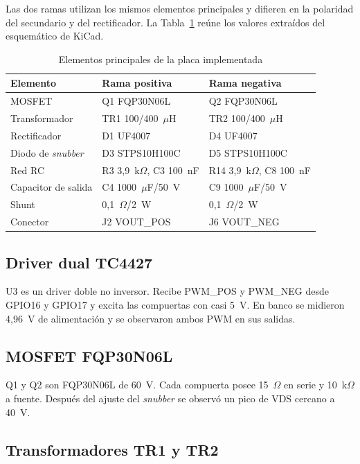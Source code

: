 \documentclass[conference]{IEEEtran}
\begin{document}
Las dos ramas utilizan los mismos elementos principales y difieren en la polaridad del secundario y del rectificador. La Tabla~\ref{tab:potencia} reúne los valores extraídos del esquemático de KiCad.

\begin{table}[!t]
\caption{Elementos principales de la placa implementada}
\label{tab:potencia}
\centering
\footnotesize
\begin{tabular}{@{}lll@{}}
\toprule
\textbf{Elemento} & \textbf{Rama positiva} & \textbf{Rama negativa} \\
\midrule
MOSFET & Q1 FQP30N06L & Q2 FQP30N06L \\
Transformador & TR1 100/400~$\mu$H & TR2 100/400~$\mu$H \\
Rectificador & D1 UF4007 & D4 UF4007 \\
Diodo de \textit{snubber} & D3 STPS10H100C & D5 STPS10H100C \\
Red RC & R3 3,9~k$\Omega$, C3 100~nF & R14 3,9~k$\Omega$, C8 100~nF \\
Capacitor de salida & C4 1000~$\mu$F/50~V & C9 1000~$\mu$F/50~V \\
Shunt & 0,1~$\Omega$/2~W & 0,1~$\Omega$/2~W \\
Conector & J2 VOUT\_POS & J6 VOUT\_NEG \\
\bottomrule
\end{tabular}
\end{table}

\subsection{Driver dual TC4427}

U3 es un driver doble no inversor. Recibe PWM\_POS y PWM\_NEG desde GPIO16 y GPIO17 y excita las compuertas con casi 5~V. En banco se midieron 4,96~V de alimentación y se observaron ambos PWM en sus salidas.

\subsection{MOSFET FQP30N06L}

Q1 y Q2 son FQP30N06L de 60~V. Cada compuerta posee 15~$\Omega$ en serie y 10~k$\Omega$ a fuente. Después del ajuste del \textit{snubber} se observó un pico de VDS cercano a 40~V.

\subsection{Transformadores TR1 y TR2}
\end{document}
